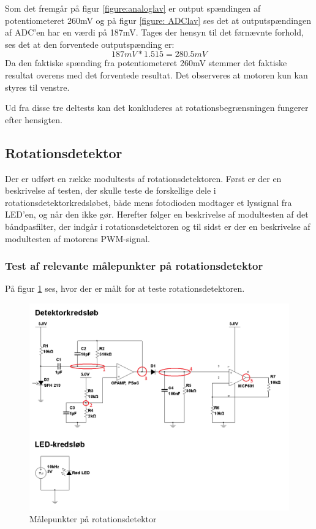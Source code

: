 \noindent Som det fremgår på figur \ref{figure:analoglav} er output spændingen af potentiometeret 260mV og på figur \ref{figure: ADClav} ses det at outputspændingen af ADC’en har en værdi på 187mV. Tages der hensyn til det førnævnte forhold, ses det at den forventede outputspænding er:
\begin{equation}
187mV * 1.515 = 280.5mV
\end{equation}
Da den faktiske spænding fra potentiometeret 260mV stemmer det faktiske resultat overens med det forventede resultat. Det observeres at motoren kun kan styres til venstre.

Ud fra disse tre deltests kan det konkluderes at rotationsbegrænsningen fungerer efter hensigten.


\subsection{Rotationsdetektor}
Der er udført en række modultests af rotationsdetektoren. Først er der en beskrivelse af testen, der skulle teste de forskellige dele i rotationsdetektorkredsløbet, både mens fotodioden modtager et lyssignal fra LED'en, og når den ikke gør. Herefter følger en beskrivelse af modultesten af det båndpasfilter, der indgår i rotationsdetektoren og til sidst er der en beskrivelse af modultesten af motorens PWM-signal. 

\subsubsection{Test af relevante målepunkter på rotationsdetektor}
På figur \ref{fig:målepunkter} ses, hvor der er målt for at teste rotationsdetektoren. 

\begin{figure}[H]
	\centering
	\includegraphics[width=\textwidth]{Test/images/rotationsdetektor_maalepunkter}
	\caption{Målepunkter på rotationsdetektor}
	\label{fig:målepunkter}
\end{figure}

